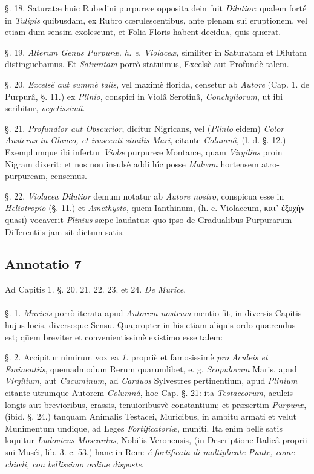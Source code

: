 \documentclass[a4paper, 11pt, oneside, polutonikogreek, german]{article}
\begin{document}
§. 18. Saturatæ huic Rubedini purpureæ opposita dein fuit \emph{Dilutior}: qualem forté in \emph{Tulipis} quibusdam, ex Rubro cœrulescentibus, ante plenam sui eruptionem, vel etiam dum sensim exolescunt, et Folia Floris habent decidua, quis quærat.

§. 19. \emph{Alterum Genus Purpuræ, h. e. Violaceæ}, similiter in Saturatam et Dilutam distinguebamus. Et \emph{Saturatam} porrò statuimus, Excelsè aut Profundè talem.

§. 20. \emph{Excelsë aut summè talis}, vel maximè florida, censetur ab \emph{Autore} (Cap. 1. de Purpurâ, §. 11.) ex \emph{Plinio}, conspici in Violâ Serotinâ, \emph{Conchyliorum}, ut ibi scribitur, \emph{vegetissimâ}.

§. 21. \emph{Profundior aut Obscurior}, dicitur Nigricans, vel (\emph{Plinio} eidem) \emph{Color Austerus in Glauco, et irascenti similis Mari}, citante \emph{Columnâ}, (l. d. §. 12.) Exemplumque ibi infertur \emph{Violæ} purpureæ Montanæ, quam \emph{Virgilius} proin Nigram dixerit: et nos non insulsè addi hîc posse \emph{Malvam} hortensem atro-purpuream, censemus.

§. 22. \emph{Violacea Dilutior} demum notatur ab \emph{Autore nostro}, conspicua esse in \emph{Heliotropio} (§. 11.) et \emph{Amethysto}, quem Ianthinum, (h. e. Violaceum, κατ' ἐξοχὴν quasi) vocaverit \emph{Plinius} sæpe-laudatus: quo ipso de Gradualibus Purpurarum Differentiis jam sit dictum satis.

\subsection{Annotatio 7}
\begin{center}
Ad Capitis 1. §. 20. 21. 22. 23. et 24. \emph{De Murice}.
\end{center}
\paragraph{}
§. 1. \emph{Muricis} porrò iterata apud \emph{Autorem nostrum} mentio fit, in diversis Capitis hujus locis, diversoque Sensu. Quapropter in his etiam aliquis ordo quærendus est; qūem breviter et convenientissimè existimo esse talem:

§. 2. Accipitur nimirum vox ea \emph{1.} propriè et famosissimè \emph{pro Aculeis et Eminentiis}, quemadmodum Rerum quarumlibet, e. g. \emph{Scopulorum} Maris, apud \emph{Virgilium}, aut \emph{Cacuminum}, ad \emph{Carduos} Sylvestres pertinentium, apud \emph{Plinium} citante utrumque Autorem \emph{Columnâ}, hoc Cap. §. 21: ita \emph{Testaceorum}, aculeis longis aut brevioribus, crassis, tenuioribusvè constantium; et præsertim \emph{Purpuræ}, (ibid. §. 24.) tanquam Animalis Testacei, Muricibus, in ambitu armati et velut Munimentum undique, ad Leges \emph{Fortificatoriæ}, muniti. Ita enim bellè satis loquitur \emph{Ludovicus Moscardus}, Nobilis Veronensis, (in Descriptione Italicâ proprii sui Muséi, lib. 3. c. 53.) hanc in Rem: \emph{é fortificata di moltiplicate Punte, come chiodi, con bellissimo ordine disposte}.
\end{document}
